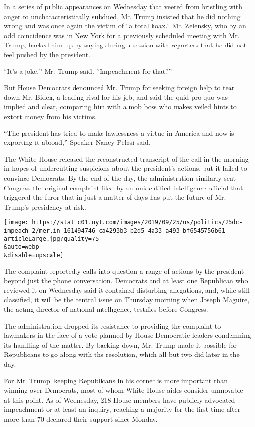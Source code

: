 In a series of public appearances on Wednesday that veered from
bristling with anger to uncharacteristically subdued, Mr. Trump insisted
that he did nothing wrong and was once again the victim of ``a total
hoax.'' Mr. Zelensky, who by an odd coincidence was in New York for a
previously scheduled meeting with Mr. Trump, backed him up by saying
during a session with reporters that he did not feel pushed by the
president.

``It's a joke,'' Mr. Trump said. ``Impeachment for that?''

But House Democrats denounced Mr. Trump for seeking foreign help to tear
down Mr. Biden, a leading rival for his job, and said the quid pro quo
was implied and clear, comparing him with a mob boss who makes veiled
hints to extort money from his victims.

``The president has tried to make lawlessness a virtue in America and
now is exporting it abroad,'' Speaker Nancy Pelosi said.

The White House released the reconstructed transcript of the call in the
morning in hopes of undercutting suspicions about the president's
actions, but it failed to convince Democrats. By the end of the day, the
administration similarly sent Congress the original complaint filed by
an unidentified intelligence official that triggered the furor that in
just a matter of days has put the future of Mr. Trump's presidency at
risk.

\texttt{[image: https://static01.nyt.com/images/2019/09/25/us/politics/25dc-impeach-2/merlin\_161494746\_ca4293b3-b2d5-4a33-a493-bf6545756b61-articleLarge.jpg?quality=75\\\&auto=webp\\\&disable=upscale]}

The complaint reportedly calls into question a range of actions by the
president beyond just the phone conversation. Democrats and at least one
Republican who reviewed it on Wednesday said it contained disturbing
allegations, and, while still classified, it will be the central issue
on Thursday morning when Joseph Maguire, the acting director of national
intelligence, testifies before Congress.

The administration dropped its resistance to providing the complaint to
lawmakers in the face of a vote planned by House Democratic leaders
condemning its handling of the matter. By backing down, Mr. Trump made
it possible for Republicans to go along with the resolution, which all
but two did later in the day.

For Mr. Trump, keeping Republicans in his corner is more important than
winning over Democrats, most of whom White House aides consider
unmovable at this point. As of Wednesday, 218 House members have
publicly advocated impeachment or at least an inquiry, reaching a
majority for the first time after more than 70 declared their support
since Monday.

